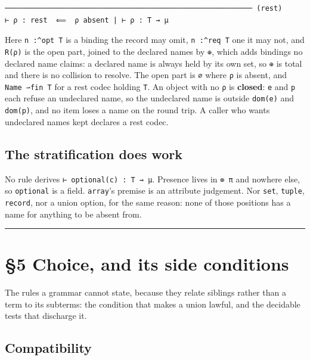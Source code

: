 \begin{definition}[(rest)]
\label{rule:rest}
\leanok
\begin{verbatim}
────────────────────────────────────────────────────────── (rest)
⊢ ρ : rest  ⟸  ρ absent | ⊢ ρ : T ⇝ μ
\end{verbatim}
\end{definition}

Here \texttt{n\ :\^{}opt\ T} is a binding the record may omit, \texttt{n\ :\^{}req\ T} one it may not, and \texttt{R(ρ)} is the open
part, joined to the declared names by \texttt{⊕}, which adds bindings no declared name claims: a
declared name is always held by its own set, so \texttt{⊕} is total and there is no collision to resolve.
The open part is
\texttt{∅} where \texttt{ρ} is absent, and \texttt{Name\ ⇀fin\ T} for a rest codec holding \texttt{T}. An object with no
\texttt{ρ} is \textbf{closed}: \texttt{e} and \texttt{p} each refuse an undeclared name, so the undeclared name is outside
\texttt{dom(e)} and \texttt{dom(p)}, and no item loses a name on the round trip. A caller who wants undeclared
names kept declares a rest codec.

\subsection{The stratification does work}\label{the-stratification-does-work}

No rule derives \texttt{⊢\ optional(c)\ :\ T\ ⇝\ μ}. Presence lives in \texttt{⊗\ π} and nowhere else, so \texttt{optional} is a field.
\texttt{array}'s premise is an attribute judgement. Nor \texttt{set}, \texttt{tuple}, \texttt{record}, nor a union option, for the
same reason: none of those positions has a name for anything to be absent from.

\begin{center}\rule{0.5\linewidth}{0.5pt}\end{center}

\section{§5 Choice, and its side conditions}\label{5-choice-and-its-side-conditions}

The rules a grammar cannot state, because they relate siblings rather than a term to its subterms:
the condition that makes a union lawful, and the decidable tests that discharge it.

\subsection{Compatibility}\label{compatibility}

